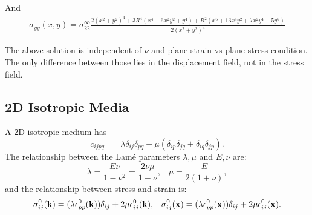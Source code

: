 \documentclass[12pt]{article}
\begin{document}
And 
\begin{eqnarray}
 \sigma_{yy}(x,y) = \sigma_{22}^\infty 
\frac{2(x^2+y^2)^4 + 3R^4(x^4-6x^2y^2+y^4)+R^2(x^6+13x^4y^2+7x^2y^4-5y^6)}{2(x^2+y^2)^4}
\end{eqnarray}

\begin{figure}[th]
\begin{center}
\end{center}
\caption{}
\label{CylindricalVoid}
\end{figure}

The above solution is independent of $\nu$ and plane strain vs plane
stress condition.  The only difference between those lies in the
displacement field, not in the stress field.



\subsection{2D Isotropic Media}
\label{sec:2DIsotropicMedia}

A 2D isotropic medium has 
\begin{equation}
 c_{ijpq} \;=\; \lambda \delta_{ij}\delta_{pq} + 
\mu(\delta_{ip}\delta_{jq}+\delta_{iq}\delta_{jp}).
\end{equation}
The relationship between the Lam\'{e} parameters $\lambda,\mu$ and $E,\nu$ are:
\begin{equation}
 \lambda = \frac{E\nu}{1-\nu^2} = \frac{2\nu\mu}{1-\nu}, \;\;\;
 \mu = \frac{E}{2(1+\nu)},
\end{equation}
and the relationship between stress and strain is:
\begin{equation}
 \sigma^0_{ij}({\bf k}) = (\lambda\epsilon^0_{pp}({\bf k}))\delta_{ij} 
                            + 2\mu\epsilon^0_{ij}({\bf k}), \;\;\;
 \sigma^0_{ij}({\bf x}) = (\lambda\epsilon^0_{pp}({\bf x}))\delta_{ij} 
                            + 2\mu\epsilon^0_{ij}({\bf x}).
\end{equation}
\end{document}
